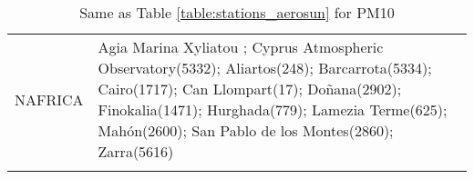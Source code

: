 \documentclass[journal abbreviation, manuscript]{copernicus}
\begin{document}
\begin{table}
\begin{tabularx}{\textwidth}{lX}
  NAFRICA &                                                                                                                                                                                                                                                                                                                                                                                                                                                                                                                                                                                                                                                                                                                                                                                                                                                                                                                                                                                                                                                                                                                                                                                                                                                                                                                                                                                                                                                                                                                                                                                                                                                                                                                                                                                                                                                                                                                                                                                                                                                                                                                                                                                                                                                                                                                                                                                                                                                                                                                                                                                                                            Agia Marina Xyliatou ; Cyprus Atmospheric Observatory(5332); Aliartos(248); Barcarrota(5334); Cairo(1717); Can Llompart(17); Doñana(2902); Finokalia(1471); Hurghada(779); Lamezia Terme(625); Mahón(2600); San Pablo de los Montes(2860); Zarra(5616) \\
\bottomhline
 \end{tabularx}
 \caption{Same as Table \ref{table:stations_aerosun} for PM10}
 \label{table:stations_pm10}
\end{table}
\end{document}
